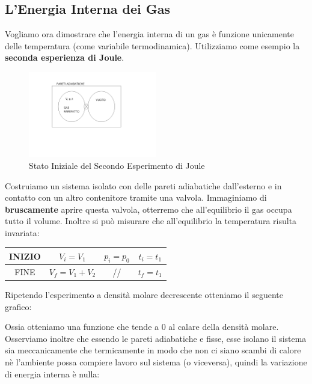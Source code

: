 \documentclass{article}
\begin{document}
\subsection{L'Energia Interna dei Gas}
Vogliamo ora dimostrare che l'energia interna di un gas è funzione unicamente delle temperatura (come variabile termodinamica). Utilizziamo come esempio la \textbf{seconda esperienza di Joule}.
\begin{figure}[H]
    \centering
    \includegraphics[width=0.5\textwidth]{SecondoJoule.png}
    \caption{Stato Iniziale del Secondo Esperimento di Joule}
    \label{SecondoJoule}
\end{figure}
Costruiamo un sistema isolato con delle pareti adiabatiche dall'esterno e in contatto con un altro contenitore tramite una valvola. Immaginiamo di \textbf{bruscamente} aprire questa valvola, otterremo che all'equilibrio il gas occupa tutto il volume. Inoltre si può misurare che all'equilibrio la temperatura risulta invariata:\\
\begin{center}
\begin{tabular}{c|c|c|c}
    INIZIO & $V_i=V_1$ & $p_i=p_0$ & $t_i=t_1$ \\
    \hline
    FINE & $V_f=V_1+V_2$ & // & $t_f=t_1$
\end{tabular} 
\end{center}
Ripetendo l'esperimento a densità molare decrescente otteniamo il seguente grafico:\\
\begin{center}
\end{center}
Ossia otteniamo una funzione che tende a 0 al calare della densità molare. Osserviamo inoltre che essendo le pareti adiabatiche e fisse, esse isolano il sistema sia meccanicamente che termicamente in modo che non ci siano scambi di calore nè l'ambiente possa compiere lavoro sul sistema (o viceversa), quindi la variazione di energia interna è nulla:
\end{document}
